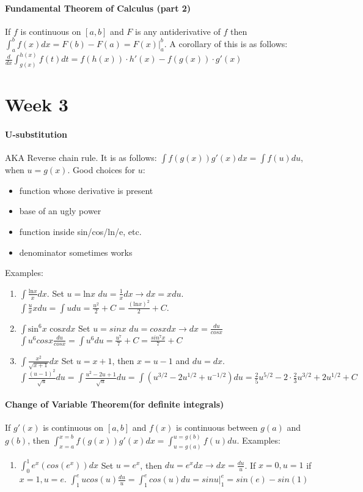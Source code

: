 \documentclass[10pt,letter]{article}
\begin{document}
\paragraph{Fundamental Theorem of Calculus (part 2)} If $f$ is continuous on $[a,b]$ and $F$ is any antiderivative of $f$ then $\int_a^bf(x)dx = F(b)-F(a)=F(x)|_a^b$. A corollary of this is as follows: $\frac{d}{dx}\int_{g(x)}^{h(x)}f(t)dt=f(h(x))\cdot h'(x) - f(g(x))\cdot g'(x)$

\pagebreak

\section*{Week 3}
\paragraph{U-substitution} AKA Reverse chain rule. It is as follows: $\int f(g(x))g'(x)dx = \int f(u)du$, when $u=g(x)$. Good choices for $u$: \begin{itemize}
    \item function whose derivative is present 
    \item base of an ugly power 
    \item function inside sin/cos/ln/e, etc.
    \item denominator sometimes works
\end{itemize}
Examples: \begin{enumerate}
    \item $\int\frac{\text{ln}x}{x}dx$. Set $u =\text{ln}x$ $du=\frac{1}{x}dx \rightarrow dx = xdu$. $\int\frac{u}{x}xdu = \int u du= \frac{u^2}{2}+C = \frac{(\text{ln}x)^2}{2}+C$. 
    \item $\int \text{sin}^6x\text{ cos}x dx$ Set $u = sinx$ $du = cosxdx\rightarrow dx = \frac{du}{cosx}$ $\int u^6 cosx \frac{du}{cosx} = \int u^6 du = \frac{u^7}{7} + C = \frac{sin^7x}{7}+C$ 
    \item $\int\frac{x^2}{\sqrt{x+1}}dx$ Set $u = x+1$, then $x = u-1$ and $du = dx$. $\int\frac{(u-1)^2}{\sqrt{u}}du = \int\frac{u^2-2u+1}{\sqrt{u}}du = \int(u^{3/2}-2u^{1/2}+u^{-1/2})du = \frac{2}{5}u^{5/2}-2\cdot\frac{2}{3}u^{3/2}+2u^{1/2}+C$
\end{enumerate}

\paragraph{Change of Variable Theorem(for definite integrals)} If $g'(x)$ is continuous on $[a,b]$ and $f(x)$ is continuous between $g(a)$ and $g(b)$, then $\int_{x=a}^{x=b}f(g(x))g'(x)dx=\int_{u=g(a)}^{u=g(b)}f(u)du$. Examples: \begin{enumerate}
    \item $\int_0^1e^x(cos(e^x))dx$ Set $u = e^x$, then $du = e^xdx\rightarrow dx=\frac{du}{u}$. If $x = 0, u=1$ if $x=1, u=e$. $\int_1^eucos(u)\frac{du}{u}=\int_1^ecos(u)du=sinu|_1^e=sin(e)-sin(1)$ 
\end{enumerate}
\end{document}
